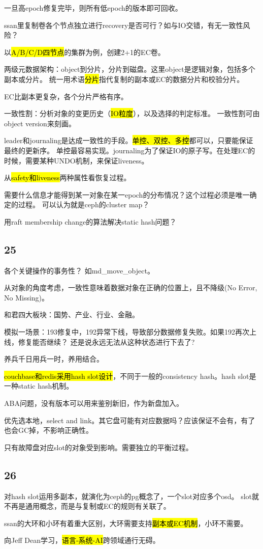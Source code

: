 一旦高epoch修复完毕，则所有低epoch的版本即可回收。

ssan里复制卷各个节点独立进行recovery是否可行？如与IO交错，有无一致性风险？

以\hl{A/B/C/D四节点}的集群为例，创建2+1的EC卷。

\hrulefill

两级元数据架构：object到分片，分片到磁盘。这里object是逻辑对象，包括多个副本或分片。
统一用术语\hl{分片}指代复制的副本或EC的数据分片和校验分片。

EC比副本更复杂，各个分片严格有序。

\hrulefill

一致性割：分析对象的变更历史（\hl{IO粒度}），以及选择的判定标准。
一致性割可由object version来刻画。

leader和journaling是达成一致性的手段。\hl{单控、双控、多控}都可以，只要能保证最终的更新序。
单控最容易实现。journaling为了保证IO的原子写。在处理EC的时候，需要某种UNDO机制，来保证liveness。

从\hl{safety和liveness}两种属性看恢复过程。

需要什么信息才能得到某一对象在某一epoch的分布情况？这个过程必须是唯一确定的过程。
可以认为就是ceph的cluster map？

用raft membership change的算法解决static hash问题？

\subsection{25}

各个关键操作的事务性？ 如md\_move\_object。

从对象的角度考虑，一致性意味着数据对象在正确的位置上，且不降级(No Error, No Missing)。

和君四大板块：国势、产业、行业、金融。

模拟一场景：193修复中，192异常下线，导致部分数据修复失败。如果192再次上线，修复能否继续？
还是说永远无法从这种状态进行下去了?

养兵千日用兵一时，养用结合。

\hl{couchbase和redis采用hash slot设计}，不同于一般的consistency hash。hash slot是一种static hash机制。

ABA问题，没有版本可以用来鉴别新旧，作为新盘加入。

优先选本地，select and link。其它盘可能有对应数据吗？应该保证不会有，有了也会GC掉，不影响正确性。

只有故障盘对应slot的对象受到影响。需要独立的平衡过程。

\subsection{26}

对hash slot运用多副本，就演化为ceph的pg概念了，一个slot对应多个osd。
slot就不再是通用概念，而是与复制或EC的规则有关联了。

ssan的大环和小环有着重大区别，大环需要支持\hl{副本或EC机制}，小环不需要。

向Jeff Dean学习，\hl{语言-系统-AI}跨领域通行无碍。
